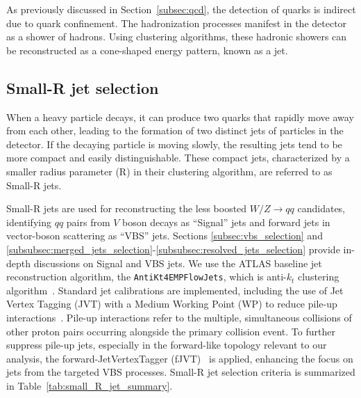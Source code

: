 
As previously discussed in Section~\ref{subsec:qcd}, the detection of quarks is indirect due to quark confinement.
The hadronization processes manifest in the detector as a shower of hadrons. Using clustering algorithms, these hadronic showers can be reconstructed as a cone-shaped energy pattern, known as a jet.


\subsection{Small-R jet selection}
\label{subsec:jet_selection}

When a heavy particle decays, it can produce two quarks that rapidly move away from each other, leading to the formation of two distinct jets of particles in the detector. If the decaying particle is moving slowly, the resulting jets tend to be more compact and easily distinguishable. These compact jets, characterized by a smaller radius parameter (R) in their clustering algorithm, are referred to as Small-R jets.

Small-R jets are used for reconstructing the less boosted $W/Z \to qq$ candidates, identifying \(qq\) pairs from \(V\) boson decays as ``Signal'' jets and forward jets in vector-boson scattering as ``VBS'' jets. Sections \ref{subsec:vbs_selection} and \ref{subsubsec:merged_jets_selection}-\ref{subsubsec:resolved_jets_selection} provide in-depth discussions on Signal and VBS jets. We use the ATLAS baseline jet reconstruction algorithm, the \texttt{AntiKt4EMPFlowJets}, which is anti-$k_t$ clustering algorithm~\cite{Cacciari_2008}.
Standard jet calibrations are implemented, including the use of Jet Vertex Tagging (JVT) with a Medium Working Point (WP) to reduce pile-up interactions~\cite{ATLAS-CONF-2014-018}.
Pile-up interactions refer to the multiple, simultaneous collisions of other proton pairs occurring alongside the primary collision event.
To further suppress pile-up jets, especially in the forward-like topology relevant to our analysis, the forward-JetVertexTagger (fJVT)~\cite{ATL-PHYS-PUB-2019-026} is applied, enhancing the focus on jets from the targeted VBS processes.
Small-R jet selection criteria is summarized in Table~\ref{tab:small_R_jet_summary}.

